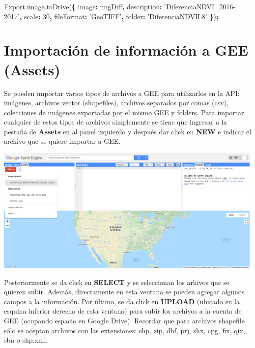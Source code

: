 \documentclass[
]{article}
\newenvironment{Shaded}{\begin{snugshade}}{\end{snugshade}}
\newcommand{\AttributeTok}[1]{\textcolor[rgb]{0.77,0.63,0.00}{#1}}
\newcommand{\DataTypeTok}[1]{\textcolor[rgb]{0.13,0.29,0.53}{#1}}
\newcommand{\DecValTok}[1]{\textcolor[rgb]{0.00,0.00,0.81}{#1}}
\newcommand{\NormalTok}[1]{#1}
\newcommand{\OperatorTok}[1]{\textcolor[rgb]{0.81,0.36,0.00}{\textbf{#1}}}
\newcommand{\StringTok}[1]{\textcolor[rgb]{0.31,0.60,0.02}{#1}}
\newcommand{\VariableTok}[1]{\textcolor[rgb]{0.00,0.00,0.00}{#1}}
\begin{document}
\begin{Shaded}
\begin{Highlighting}[]
\VariableTok{Export}\NormalTok{.}\VariableTok{image}\NormalTok{.}\AttributeTok{toDrive}\NormalTok{(}\OperatorTok{\{}
  \DataTypeTok{image}\OperatorTok{:}\NormalTok{ imgDiff}\OperatorTok{,}
  \DataTypeTok{description}\OperatorTok{:} \StringTok{'DiferenciaNDVI_2016-2017'}\OperatorTok{,}
  \DataTypeTok{scale}\OperatorTok{:} \DecValTok{30}\OperatorTok{,}
  \DataTypeTok{fileFormat}\OperatorTok{:} \StringTok{'GeoTIFF'}\OperatorTok{,}
  \DataTypeTok{folder}\OperatorTok{:} \StringTok{'DiferenciaNDVIL8'}
\OperatorTok{\}}\NormalTok{)}\OperatorTok{;} 
\end{Highlighting}
\end{Shaded}

\newpage

\hypertarget{importaciuxf3n-de-informaciuxf3n-a-gee-assets}{%
\section{Importación de información a GEE
(Assets)}\label{importaciuxf3n-de-informaciuxf3n-a-gee-assets}}

Se pueden importar varios tipos de archivos a GEE para utilizarlos en la
API: imágenes, archivos vector (shapefiles), archivos separados por
comas (csv), colecciones de imágenes exportadas por el mismo GEE y
folders. Para importar cualquier de estos tipos de archivos simplemente
se tiene que ingresar a la pestaña de \textbf{Assets} en al panel
izquierdo y después dar click en \textbf{NEW} e indicar el archivo que
se quiere importar a GEE.

\includegraphics[width=500px]{Img/Asset1}

Posteriormente se da click en \textbf{SELECT} y se seleccionan los
arhivos que se quieren subir. Además, directamente en esta ventana se
pueden agregar algunos campos a la información. Por último, se da click
en \textbf{UPLOAD} (ubicado en la esquina inferior derecha de esta
ventana) para subir los archivos a la cuenta de GEE (ocupando espacio en
Google Drive). Recordar que para archivos shapefile sólo se aceptan
archivos con las extensiones: shp, zip, dbf, prj, shx, cpg, fix, qix,
sbn o shp.xml.
\end{document}
